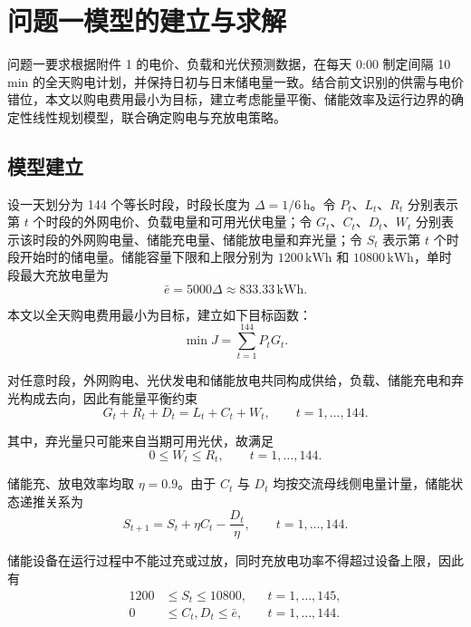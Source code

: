 \section{问题一模型的建立与求解}
\label{sec:q1-model}

问题一要求根据附件 1 的电价、负载和光伏预测数据，在每天 0:00 制定间隔 10 min 的全天购电计划，并保持日初与日末储电量一致。结合前文识别的供需与电价错位，本文以购电费用最小为目标，建立考虑能量平衡、储能效率及运行边界的确定性线性规划模型，联合确定购电与充放电策略。

\subsection{模型建立}

设一天划分为 144 个等长时段，时段长度为 $\Delta=1/6\,\mathrm{h}$。令 $P_t$、$L_t$、$R_t$ 分别表示第 $t$ 个时段的外网电价、负载电量和可用光伏电量；令 $G_t$、$C_t$、$D_t$、$W_t$ 分别表示该时段的外网购电量、储能充电量、储能放电量和弃光量；令 $S_t$ 表示第 $t$ 个时段开始时的储电量。储能容量下限和上限分别为 $1200\,\mathrm{kWh}$ 和 $10800\,\mathrm{kWh}$，单时段最大充放电量为
\begin{equation}
  \bar e=5000\Delta\approx833.33\,\mathrm{kWh}.
  \label{eq:q1-energy-limit}
\end{equation}

本文以全天购电费用最小为目标，建立如下目标函数：
\begin{equation}
  \min J=\sum_{t=1}^{144}P_tG_t.
  \label{eq:q1-objective}
\end{equation}

对任意时段，外网购电、光伏发电和储能放电共同构成供给，负载、储能充电和弃光构成去向，因此有能量平衡约束
\begin{equation}
  G_t+R_t+D_t=L_t+C_t+W_t,\qquad t=1,\ldots,144.
  \label{eq:q1-balance}
\end{equation}

其中，弃光量只可能来自当期可用光伏，故满足
\begin{equation}
  0\le W_t\le R_t,\qquad t=1,\ldots,144.
  \label{eq:q1-curtailment}
\end{equation}

储能充、放电效率均取 $\eta=0.9$。由于 $C_t$ 与 $D_t$ 均按交流母线侧电量计量，储能状态递推关系为
\begin{equation}
  S_{t+1}=S_t+\eta C_t-\frac{D_t}{\eta},\qquad t=1,\ldots,144.
  \label{eq:q1-storage}
\end{equation}

储能设备在运行过程中不能过充或过放，同时充放电功率不得超过设备上限，因此有
\begin{align}
  1200&\le S_t\le10800, && t=1,\ldots,145,
  \label{eq:q1-storage-bounds}\\
  0&\le C_t,D_t\le\bar e, && t=1,\ldots,144.
  \label{eq:q1-charge-bounds}
\end{align}

